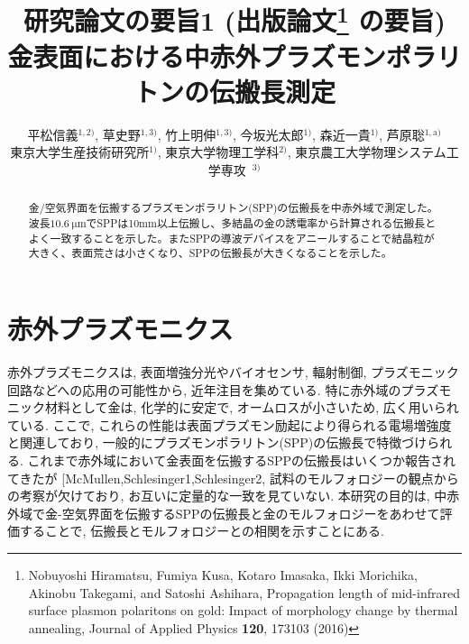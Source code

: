 \documentclass[a4,10truept]{jsarticle}
\title{研究論文の要旨1 (出版論文\thanks{Nobuyoshi Hiramatsu, Fumiya Kusa, Kotaro Imasaka, Ikki Morichika, Akinobu Takegami, and Satoshi Ashihara, Propagation length of mid-infrared surface plasmon polaritons on gold: Impact of morphology change by thermal annealing, Journal of Applied Physics {\bf 120}, 173103 (2016)
} の要旨)\\
金表面における中赤外プラズモンポラリトンの伝搬長測定}
\author{平松信義$\!^{1,2)}$, 草史野$\!^{1,3)}$, 竹上明伸$\!^{1,3)}$, 今坂光太郎$\!^{1)}$, 森近一貴$\!^{1)}$, 芦原聡$\!^{1,\mathrm{a})}$\\ 東京大学生産技術研究所$\!^{1)}$, 東京大学物理工学科$\!^{2)}$, 東京農工大学物理システム工学専攻~$\!^{3)}$}
\date{}
\makeatletter
\DeclareRobustCommand\cite{\unskip
\@ifnextchar[{\@tempswatrue\@citex}{\@tempswafalse\@citex[]}}
\makeatother
\begin{document}
\maketitle
\thispagestyle{mypagestyle}

\begin{abstract}
{\fontsize{10pt}{0pt} 金/空気界面を伝搬するプラズモンポラリトン(SPP)の伝搬長を中赤外域で測定した。波長$10.6\:\mathrm{\mu m}$でSPPは10mm以上伝搬し、多結晶の金の誘電率から計算される伝搬長とよく一致することを示した。またSPPの導波デバイスをアニールすることで結晶粒が大きく、表面荒さは小さくなり、SPPの伝搬長が大きくなることを示した。}
\end{abstract}

\section{赤外プラズモニクス}
\vspace{-0.5em}
\mc 赤外プラズモニクスは,  表面増強分光やバイオセンサ, 輻射制御, プラズモニック回路などへの応用の可能性から, 近年注目を集めている. 特に赤外域のプラズモニック材料として金は, 化学的に安定で, オームロスが小さいため, 広く用いられている. 
ここで, これらの性能は表面プラズモン励起により得られる電場増強度と関連しており, 一般的にプラズモンポラリトン(SPP)の伝搬長で特徴づけられる. 
これまで赤外域において金表面を伝搬するSPPの伝搬長はいくつか報告されてきたが\cite{McMullen,Schlesinger1,Schlesinger2}, 試料のモルフォロジーの観点からの考察が欠けており, お互いに定量的な一致を見ていない. 本研究の目的は, 中赤外域で金-空気界面を伝搬するSPPの伝搬長と金のモルフォロジーをあわせて評価することで, 伝搬長とモルフォロジーとの相関を示すことにある. 

\vspace{-0.2em}
\end{document}

